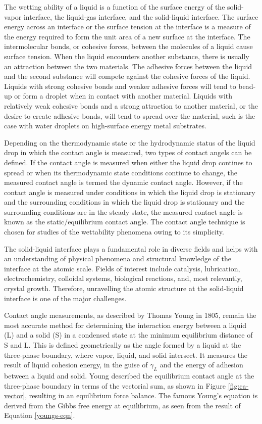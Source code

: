 The wetting ability of a liquid is a function of the surface energy of the solid-vapor interface, the liquid-gas interface, and the solid-liquid interface. The surface energy across an interface or the surface tension at the interface is a measure of the energy required to form the unit area of a new surface at the interface. The intermolecular bonds, or cohesive forces, between the molecules of a liquid cause surface tension. When the liquid encounters another substance, there is usually an attraction between the two materials. The adhesive forces between the liquid and the second substance will compete against the cohesive forces of the liquid.  Liquids with strong cohesive bonds and weaker adhesive forces will tend to bead-up or form a droplet when in contact with another material. Liquids with relatively weak cohesive bonds and a strong attraction to another material, or the desire to create adhesive bonds, will tend to spread over the material, such is the case with water droplets on high-surface energy metal substrates.

Depending on the thermodynamic state or the hydrodynamic status of the liquid drop in which the contact angle is measured, two types of contact angels can be defined. If the contact angle is measured when either the liquid drop contines to spread or when its thermodynamic state conditions continue to change, the measured contact angle is termed the dynamic contact angle. However, if the contact angle is measured under conditions in which the liquid drop is stationary and the surrounding conditions in which the liquid drop is stationary and the surrounding conditions are in the steady state, the measured contact angle is known as the static/equilibrium contact angle. The contact angle technique is chosen for studies of the wettability phenomena owing to its simplicity. 

The solid-liquid interface plays a fundamental role in diverse fields and helps with an understanding of physical phenomena and structural knowledge of the interface at the atomic scale. Fields of interest include catalysis, lubrication, electrochemistry, colloidal systems, biological reactions, and, most relevantly, crystal growth. Therefore, unravelling the atomic structure at the solid-liquid interface is one of the major challenges. 

Contact angle measurements, as described by Thomas Young in 1805, remain the most accurate method for determining the interaction energy between a liquid (L) and a solid (S) in a condensed state at the minimum equilibrium distance of S and L. This is defined geometrically as the angle formed by a liquid at the three-phase boundary, where vapor, liquid, and solid intersect. It measures the result of liquid cohesion energy, in the guise of $\gamma_{L}$ and the energy of adhesion between a liquid and solid. Young described the equilibrium contact angle at the three-phase boundary in terms of the vectorial sum, as shown in Figure \ref{fig:ca-vector}, resulting in an equilibrium force balance. The famous Young's equation is derived from the Gibbs free energy at equilibrium, as seen from the result of Equation \ref{youngs-eqn}. 

